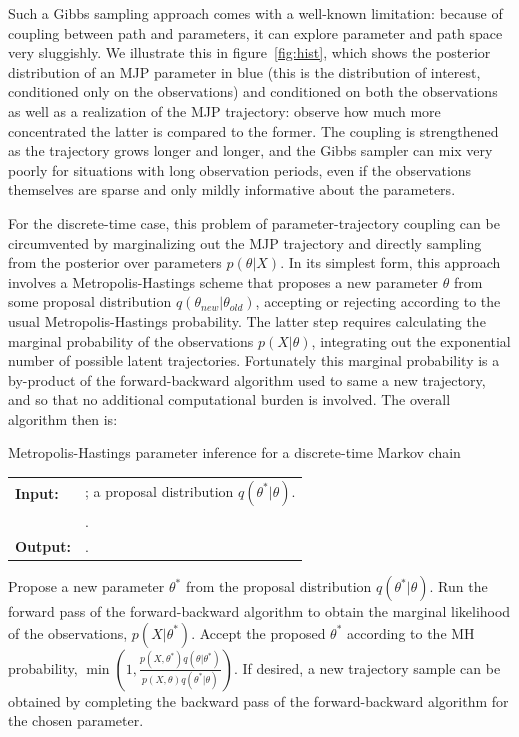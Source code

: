 Such a Gibbs sampling approach comes with a well-known limitation:
because of coupling between path and parameters, it can explore parameter 
and path space very sluggishly. We illustrate this in figure~\ref{fig:hist},
which shows the posterior distribution of an MJP parameter in blue
(this is the distribution of interest, conditioned only on the observations) 
and conditioned on both the observations 
as well as a realization of the MJP trajectory: observe how much
more concentrated the latter is compared to the former. The
coupling is strengthened as the trajectory grows longer and longer, and
the Gibbs sampler can mix very poorly for situations with
long observation periods, even if the observations themselves are
sparse and only mildly informative about the parameters.

For the discrete-time case, this problem of parameter-trajectory
coupling can be circumvented by marginalizing out the MJP trajectory 
and directly sampling from the posterior over parameters $p(\theta|X)$.
In its simplest form, this approach involves a Metropolis-Hastings
scheme that proposes a new parameter $\theta$ from some proposal distribution 
$q(\theta_{new}|\theta_{old})$, accepting or rejecting according to the usual
Metropolis-Hastings probability. The latter step requires calculating the 
marginal probability of the observations $p(X|\theta)$, integrating out
the exponential number of possible latent trajectories. Fortunately
this marginal probability is a by-product of the forward-backward
algorithm used to same a new trajectory, and so that no 
additional computational burden is involved. The overall algorithm then is:

\begin{algorithm}[H]
  \caption{Metropolis-Hastings parameter inference for a discrete-time 
Markov chain}
   \label{alg:disc_time_mh}
  \begin{tabular}{l l}
   \textbf{Input:  } & \text{A set of partial and noisy observations $X$};
    a proposal distribution $q(\theta^*|\theta)$. \\
  & \text{The previous Markov chain parameters $\theta$}.\\
  \textbf{Output:  }& \text{A new Markov chain parameter $\theta^*$}.\\
   \hline
   \end{tabular}
   \begin{algorithmic}[1]
  \State Propose a new parameter $\theta^*$ from the proposal distribution
    $q(\theta^*|\theta)$.
  \State Run the forward pass of the forward-backward algorithm to 
    obtain the marginal likelihood of the observations, $p(X|\theta^*)$.
  \State Accept the proposed $\theta^*$ according to the MH probability, 
    $\min(1,\frac{p(X,\theta^*)q(\theta|\theta^*)}{p(X,\theta)q(\theta^*|\theta)})$.
  \State If desired, a new trajectory sample can be obtained by
    completing the backward pass of the forward-backward algorithm for the chosen
    parameter.
\end{algorithmic}
\end{algorithm}

